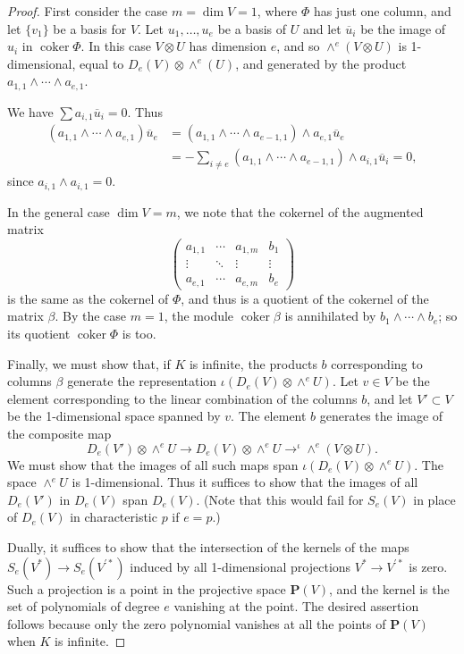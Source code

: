 \documentclass{tran-l}
\theoremstyle{plain}
\theoremstyle{remark}
\theoremstyle{definition}
\newcommand{\coker}{\operatorname{coker}}
\newcommand{\PP}{{\mathbf P}}
\begin{document}
\begin{proof}[Proof]
First consider the case $m=\dim V=1$, 
where $\Phi $ has
just one column, and let $\{v_{1}\}$ be a basis for $V$. 
Let $u_{1},\dots ,u_{e}$ be a basis of 
$U$ and let $\overline{u}_{i}$ be the image of $u_{i}$ in
$\coker \Phi $. In this case $V\otimes U$ has
dimension $e$, and so $\wedge ^{e}(V\otimes U)$ is 1-dimensional,
equal to $D_{e}(V)\otimes \wedge ^{e}(U)$, and generated by the 
product $a_{1,1}\wedge \cdots \wedge a_{e,1}$.

We have $\sum a_{i,1}\overline{u}_{i}=0$.
Thus
\begin{align*}
(a_{1,1}\wedge \cdots \wedge a_{e,1}) \overline{u}_{e}
&=
(a_{1,1}\wedge \cdots \wedge a_{e-1,1})\wedge a_{e,1}\overline{u}_{e}\\
&=
-\sum _{i\neq e}
(a_{1,1}\wedge \cdots \wedge a_{e-1,1}) \wedge a_{i,1}\overline{u}_{i}
=0,
\end{align*}
since $a_{i,1}\wedge a_{i,1}=0.$

In the general case $\dim V= m$, we note that the cokernel of
the augmented matrix
\begin{equation*}
\left(\begin{matrix}
a_{1,1}&\cdots&a_{1,m}& b_1\\
\vdots&\ddots&\vdots&\vdots\\
a_{e,1}&\cdots&a_{e,m}& b_e
\end{matrix}\right)
\end{equation*}
is the same as the cokernel of $\Phi $, and thus
is a quotient of the cokernel of the matrix $\beta $.
By the case $m=1$, the module $\coker \beta $ is annihilated 
by $ b_{1}\wedge \cdots \wedge b_{e}$;
so its quotient $\coker \Phi $ is too.

Finally, we must show that, if $K$ is infinite, the products 
$b$ corresponding to columns $\beta $ generate the representation
$\iota (D_{e}(V)\otimes \wedge ^{e} U)$. Let $v\in V$ be the
element corresponding to the linear combination of the 
columns $b$, and let $V'\subset V$ be the 1-dimensional
space spanned by $v$. The element $b$ generates the
image of the composite map 
\begin{equation*}D_{e}(V')\otimes \wedge ^{e} U\to D_{e}(V)\otimes \wedge ^{e}
U\to ^{\iota }\wedge ^{e}(V\otimes U). 
\end{equation*} 
We must 
show that the images of all such maps span 
$\iota (D_{e}(V)\otimes \wedge ^{e} U)$.
The space $\wedge ^{e}U$ is 1-dimensional. Thus it suffices
to show that the images of all $D_{e}(V')$ in $D_{e}(V)$ span 
$D_{e}(V)$. (Note that this would fail for $S_{e}(V)$ in place of
$D_{e}(V)$ in characteristic $p$ if $e=p$.)

Dually, it suffices to show that the intersection of the  kernels of the maps
$S_{e}(V^{*})\to S_{e}(V^{'*})$ induced by all 1-dimensional projections
$V^{*}\to V^{'*}$ is zero. Such a projection is a point in the projective space
$\PP (V)$, and the kernel is the set of polynomials of degree $e$ vanishing at
the point. The desired assertion follows because only the zero polynomial
vanishes at all the points of $\PP (V)$ when $K$ is infinite. \end{proof}
\end{document}
